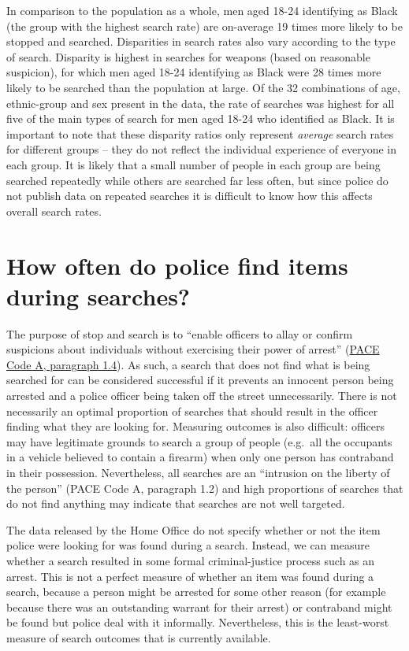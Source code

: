 \documentclass[
  a4paper,
  twoside, 11pt]{article}
\begin{document}
In comparison to the population as a whole, men aged 18-24 identifying as Black (the group with the highest search rate) are on-average 19 times more likely to be stopped and searched. Disparities in search rates also vary according to the type of search. Disparity is highest in searches for weapons (based on reasonable suspicion), for which men aged 18-24 identifying as Black were 28 times more likely to be searched than the population at large. Of the 32 combinations of age, ethnic-group and sex present in the data, the rate of searches was highest for all five of the main types of search for men aged 18-24 who identified as Black. It is important to note that these disparity ratios only represent \emph{average} search rates for different groups -- they do not reflect the individual experience of everyone in each group. It is likely that a small number of people in each group are being searched repeatedly while others are searched far less often, but since police do not publish data on repeated searches it is difficult to know how this affects overall search rates.

\hypertarget{how-often-do-police-find-items-during-searches}{%
\section{How often do police find items during searches?}\label{how-often-do-police-find-items-during-searches}}

The purpose of stop and search is to ``enable officers to allay or confirm suspicions about individuals without exercising their power of arrest'' (\href{https://www.gov.uk/guidance/police-and-criminal-evidence-act-1984-pace-codes-of-practice}{PACE Code A, paragraph 1.4}). As such, a search that does not find what is being searched for can be considered successful if it prevents an innocent person being arrested and a police officer being taken off the street unnecessarily. There is not necessarily an optimal proportion of searches that should result in the officer finding what they are looking for. Measuring outcomes is also difficult: officers may have legitimate grounds to search a group of people (e.g.~all the occupants in a vehicle believed to contain a firearm) when only one person has contraband in their possession. Nevertheless, all searches are an ``intrusion on the liberty of the person'' (PACE Code A, paragraph 1.2) and high proportions of searches that do not find anything may indicate that searches are not well targeted.

The data released by the Home Office do not specify whether or not the item police were looking for was found during a search. Instead, we can measure whether a search resulted in some formal criminal-justice process such as an arrest. This is not a perfect measure of whether an item was found during a search, because a person might be arrested for some other reason (for example because there was an outstanding warrant for their arrest) or contraband might be found but police deal with it informally. Nevertheless, this is the least-worst measure of search outcomes that is currently available.
\end{document}
